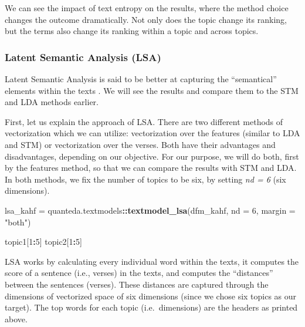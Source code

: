 \documentclass[
]{article}
\newenvironment{Shaded}{\begin{snugshade}}{\end{snugshade}}
\newcommand{\AttributeTok}[1]{\textcolor[rgb]{0.13,0.29,0.53}{#1}}
\newcommand{\DecValTok}[1]{\textcolor[rgb]{0.00,0.00,0.81}{#1}}
\newcommand{\FunctionTok}[1]{\textcolor[rgb]{0.13,0.29,0.53}{\textbf{#1}}}
\newcommand{\NormalTok}[1]{#1}
\newcommand{\OtherTok}[1]{\textcolor[rgb]{0.56,0.35,0.01}{#1}}
\newcommand{\SpecialCharTok}[1]{\textcolor[rgb]{0.81,0.36,0.00}{\textbf{#1}}}
\newcommand{\StringTok}[1]{\textcolor[rgb]{0.31,0.60,0.02}{#1}}
\begin{document}
We can see the impact of text entropy on the results, where the method choice changes the outcome dramatically. Not only does the topic change its ranking, but the terms also change its ranking within a topic and across topics.

\hypertarget{latent-semantic-analysis-lsa}{%
\subsubsection{Latent Semantic Analysis (LSA)}\label{latent-semantic-analysis-lsa}}

Latent Semantic Analysis is said to be better at capturing the ``semantical'' elements within the texts \citep{landauer1998}. We will see the results and compare them to the STM and LDA methods earlier.

First, let us explain the approach of LSA. There are two different methods of vectorization which we can utilize: vectorization over the features (similar to LDA and STM) or vectorization over the verses. Both have their advantages and disadvantages, depending on our objective. For our purpose, we will do both, first by the features method, so that we can compare the results with STM and LDA. In both methods, we fix the number of topics to be six, by setting \emph{nd = 6} (six dimensions).

\footnotesize

\begin{Shaded}
\begin{Highlighting}[]
\NormalTok{lsa\_kahf }\OtherTok{=}\NormalTok{ quanteda.textmodels}\SpecialCharTok{::}\FunctionTok{textmodel\_lsa}\NormalTok{(dfm\_kahf, }\AttributeTok{nd =} \DecValTok{6}\NormalTok{, }\AttributeTok{margin =} \StringTok{"both"}\NormalTok{)}
\end{Highlighting}
\end{Shaded}

\begin{Shaded}
\begin{Highlighting}[]
\NormalTok{topic1[}\DecValTok{1}\SpecialCharTok{:}\DecValTok{5}\NormalTok{]}
\NormalTok{topic2[}\DecValTok{1}\SpecialCharTok{:}\DecValTok{5}\NormalTok{]}
\end{Highlighting}
\end{Shaded}

\normalsize

LSA works by calculating every individual word within the texts, it computes the score of a sentence (i.e., verses) in the texts, and computes the ``distances'' between the sentences (verses). These distances are captured through the dimensions of vectorized space of six dimensions (since we chose six topics as our target). The top words for each topic (i.e.~dimensions) are the headers as printed above.
\end{document}

